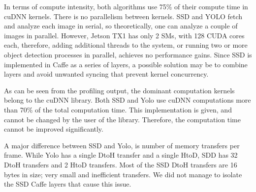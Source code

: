 In terms of compute intensity, both algorithms use 75\% of their compute time in cuDNN kernels. There is no parallelism between kernels. SSD and YOLO fetch and analyze each image in serial, so theoretically, one can analyze a couple of images in parallel. However, Jetson TX1 has only 2 SMs, with 128 CUDA cores each, therefore, adding additional threads to the system, or running two or more object detection processes in parallel, achieves no performance gains. Since SSD is implemented in Caffe as a series of layers, a possible solution may be to combine layers and avoid unwanted syncing that prevent kernel concurrency.

As can be seen from the profiling output, the dominant computation kernels belong to the cuDNN library. Both SSD and Yolo use cuDNN computations more than 70\% of the total computation time. This implementation is given, and cannot be changed by the user of the library. Therefore, the computation time cannot be improved significantly.

A major difference between SSD and Yolo, is number of memory transfers per frame. While Yolo has a single DtoH transfer and a single HtoD, SDD has 32 DtoH transfers and 2 HtoD transfers. Most of the SSD DtoH transfers are 16 bytes in size; very small and inefficient transfers. We did not manage to isolate the SSD Caffe layers that cause this issue.  



